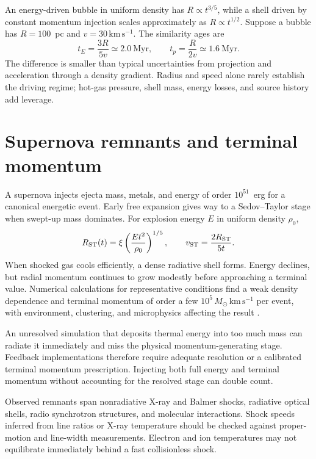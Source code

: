 An energy-driven bubble in uniform density has $R\propto t^{3/5}$, while a shell
driven by constant momentum injection scales approximately as $R\propto t^{1/2}$.
Suppose a bubble has $R=100$~pc and $v=30\,\mathrm{km\,s^{-1}}$.  The similarity ages
are
\begin{equation}
 t_E=\frac{3R}{5v}\simeq2.0~\mathrm{Myr},\qquad
 t_p=\frac{R}{2v}\simeq1.6~\mathrm{Myr}.
\end{equation}
The difference is smaller than typical uncertainties from projection and acceleration
through a density gradient.  Radius and speed alone rarely establish the driving
regime; hot-gas pressure, shell mass, energy losses, and source history add leverage.

\section{Supernova remnants and terminal momentum}

A supernova injects ejecta mass, metals, and energy of order $10^{51}$~erg for a
canonical energetic event.  Early free expansion gives way to a Sedov--Taylor stage
when swept-up mass dominates.  For explosion energy $E$ in uniform density $\rho_0$,
\begin{equation}
 R_{\rm ST}(t)=\xi\left(\frac{Et^2}{\rho_0}\right)^{1/5},
 \qquad v_{\rm ST}=\frac{2R_{\rm ST}}{5t}.
 \label{eq:sedov-taylor}
\end{equation}
When shocked gas cools efficiently, a dense radiative shell forms.  Energy declines,
but radial momentum continues to grow modestly before approaching a terminal value.
Numerical calculations for representative conditions find a weak density dependence
and terminal momentum of order a few
$10^5\,M_\odot\,\mathrm{km\,s^{-1}}$ per event, with environment, clustering, and
microphysics affecting the result \citep{KimOstriker2015}.

An unresolved simulation that deposits thermal energy into too much mass can radiate
it immediately and miss the physical momentum-generating stage.  Feedback
implementations therefore require adequate resolution or a calibrated terminal
momentum prescription.  Injecting both full energy and terminal momentum without
accounting for the resolved stage can double count.

Observed remnants span nonradiative X-ray and Balmer shocks, radiative optical shells,
radio synchrotron structures, and molecular interactions.  Shock speeds inferred from
line ratios or X-ray temperature should be checked against proper-motion and line-width
measurements.  Electron and ion temperatures may not equilibrate immediately behind a
fast collisionless shock.

